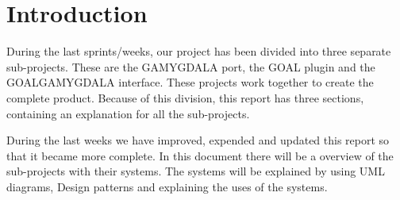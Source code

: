 \section{Introduction} 
During the last sprints/weeks, our project has been divided into three separate sub-projects. These are the GAMYGDALA port, the GOAL plugin and the GOALGAMYGDALA interface. These projects work together to create the complete product. Because of this division, this report has three sections, containing an explanation for all the sub-projects. \\ \par
During the last weeks we have improved, expended and updated this report so that it became more complete. In this document there will be a overview of the sub-projects with their systems. The systems will be explained by using UML diagrams, Design patterns and explaining the uses of the systems.